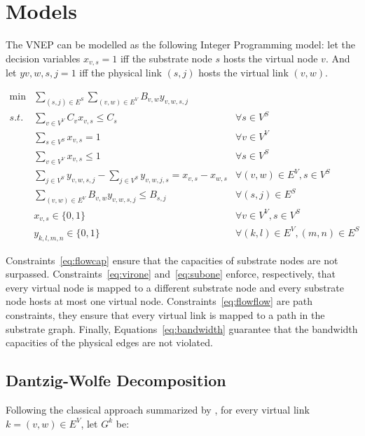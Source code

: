 \chapter{Models}

The VNEP can be modelled as the following Integer Programming model: let the decision variables $x_{v,s} = 1$ iff the substrate node $s$ hosts the virtual node $v$. And let $y{v,w,s,j} = 1$ iff the physical link $(s,j)$ hosts the virtual link $(v,w)$.

\begin{align}
    \min & \sum\limits_{(s,j) \in E^{S}} \sum\limits_{(v,w) \in E^{V}} B_{v,w} y_{v,w,s,j} \nonumber \\
    s.t. & \sum\limits_{v \in V^{V}} C_{v} x_{v,s} \leq C_{s}                     & \forall s \in V^{S}  \label{eq:flowcap} \\
    & \sum\limits_{s \in V^{S}} x_{v,s} = 1                                  & \forall v \in V^{V}  \label{eq:flowvirone}\\
         & \sum\limits_{v \in V^{V}} x_{v,s} \leq 1                               & \forall s \in V^{S} \label{eq:flowsubone}\\
         & \sum\limits_{j \in V^{S}} y_{v,w,s,j} - \sum\limits_{j \in V^{S}} y_{v,w,j,s} =  x_{v,s} - x_{w,s}  & \forall (v,w) \in E^{V}, s \in V^{S}\label{eq:flowflow} \\
         & \sum\limits_{(v,w) \in E^{V}} B_{v,w} y_{v,w,s,j} \leq B_{s,j}  & \forall (s,j) \in E^{S} \label{eq:flowbandwidth} \\
         & x_{v,s} \in \{0,1\} & \forall v \in V^{V}, s \in V^{S} \\
         & y_{k,l,m,n} \in \{0,1\} & \forall (k,l) \in E^{V}, (m,n) \in E^{S}
\end{align}

Constraints~\eqref{eq:flowcap} ensure that the capacities of substrate nodes are not surpassed. Constraints~\eqref{eq:virone} and~\eqref{eq:subone} enforce, respectively, that every virtual node is mapped to a different substrate node and every substrate node hosts at most one virtual node. Constraints~\eqref{eq:flowflow} are path constraints, they ensure that every virtual link is mapped to a path in the substrate graph. Finally, Equations~\eqref{eq:bandwidth} guarantee that the bandwidth capacities of the physical edges are not violated.

\section{Dantzig-Wolfe Decomposition}
Following the classical approach summarized by \cite{Lubbecke:04}, for every virtual link $k = (v, w) \in E^V$, let $G^k$ be:


